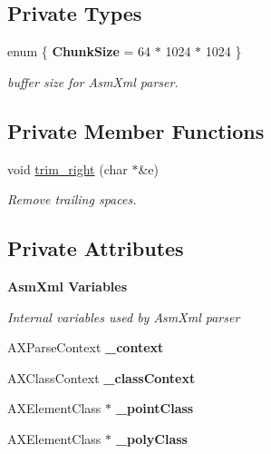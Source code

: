 \subsection*{Private Types}
\begin{DoxyCompactItemize}
\item 
enum \{ {\bfseries Chunk\-Size} = 64 $\ast$ 1024 $\ast$ 1024
 \}
\begin{DoxyCompactList}\small\item\em buffer size for Asm\-Xml parser. \end{DoxyCompactList}\end{DoxyCompactItemize}
\subsection*{Private Member Functions}
\begin{DoxyCompactItemize}
\item 
void \hyperlink{classSigSpatial2013_1_1GMLParser_a57eafa968caebbba840d6a58a2c562dc}{trim\-\_\-right} (char $\ast$\&e)
\begin{DoxyCompactList}\small\item\em Remove trailing spaces. \end{DoxyCompactList}\end{DoxyCompactItemize}
\subsection*{Private Attributes}
\begin{Indent}{\bf Asm\-Xml Variables}\par
{\em Internal variables used by Asm\-Xml parser }\begin{DoxyCompactItemize}
\item 
\hypertarget{classSigSpatial2013_1_1GMLParser_aa69cab81d25d69d5285a38ff98239596}{A\-X\-Parse\-Context {\bfseries \-\_\-context}}\label{classSigSpatial2013_1_1GMLParser_aa69cab81d25d69d5285a38ff98239596}

\item 
\hypertarget{classSigSpatial2013_1_1GMLParser_ab96f62ed746bc716f928d2875ad68ca0}{A\-X\-Class\-Context {\bfseries \-\_\-class\-Context}}\label{classSigSpatial2013_1_1GMLParser_ab96f62ed746bc716f928d2875ad68ca0}

\item 
\hypertarget{classSigSpatial2013_1_1GMLParser_a302a903e23e6c3660c5d06fcb944cf5d}{A\-X\-Element\-Class $\ast$ {\bfseries \-\_\-point\-Class}}\label{classSigSpatial2013_1_1GMLParser_a302a903e23e6c3660c5d06fcb944cf5d}

\item 
\hypertarget{classSigSpatial2013_1_1GMLParser_a267244fa4122657b4a113f9d29378321}{A\-X\-Element\-Class $\ast$ {\bfseries \-\_\-poly\-Class}}\label{classSigSpatial2013_1_1GMLParser_a267244fa4122657b4a113f9d29378321}

\end{DoxyCompactItemize}
\end{Indent}


